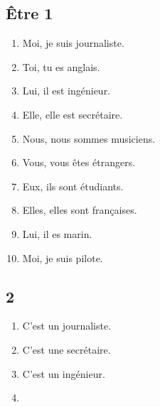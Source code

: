 \subsection*{Être 1}

\begin{enumerate}
    \item Moi, je suis journaliste.
    \item Toi, tu es anglais.
    \item Lui, il est ingénieur.
    \item Elle, elle est secrétaire.
    \item Nous, nous sommes musiciens.
    \item Vous, vous êtes étrangers.
    \item Eux, ils sont étudiants.
    \item Elles, elles sont françaises.
    \item Lui, il es marin.
    \item Moi, je suis pilote.
\end{enumerate}

\subsection*{2}

\begin{enumerate}
    \item C'est un journaliste.
    \item C'est une secrétaire.
    \item C'est un ingénieur.
    \item 
\end{enumerate}